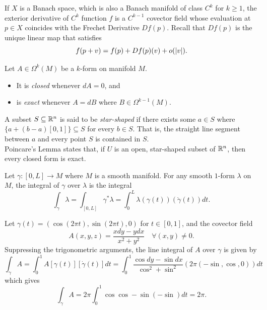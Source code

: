 \documentclass[../main-v2-manifolds.tex]{subfiles}
\begin{document}
\begin{remark}
    If $X$ is a Banach space, which is also a Banach manifold of class $C^k$ for $k\geq 1$, the exterior derivative of $C^k$ function $f$ is a $C^{k-1}$ covector field whose evaluation at $p\in X$ coincides with the Frechet Derivative $Df(p)$. Recall that $Df(p)$ is the unique linear map that satisfies
    \[
        f(p + v) = f(p) + Df(p)(v) + o(\vert {v} \vert).
    \]
\end{remark}
\begin{remark}
    Let $A\in \Omega^k(M)$ be a $k$-form on manifold $M$. 
    \begin{itemize}
        \item It is \emph{closed} whenever $dA = 0$, and
        \item is \emph{exact} whenever $A = dB$ where $B \in \Omega^{k-1}(M)$.
    \end{itemize}
\end{remark}
\begin{remark}
    A subset $S\subseteq{\mathbb{R}^n}$ is said to be \emph{star-shaped} if there exists some $a\in S$ where $\{a + (b-a)[0,1]\}\subseteq S$ for every $b\in S$. That is, the straight line segment between $a$ and every point $S$ is contained in $S$.\\

    Poincare's Lemma states that, if $U$ is an open, star-shaped subset of ${\mathbb{R}^n}$, then every closed form is exact.
\end{remark}
\begin{remark}
    Let $\gamma: [0,L]\to M$ where $M$ is a smooth manifold. For any smooth $1$-form $\lambda$ on $M$, the integral of $\gamma$ over $\lambda$ is the integral
    \[
        \int_\gamma \lambda =  \int_{[0,L]} \gamma^*\lambda = \int_{0}^{L}\lambda(\gamma(t))(\mathring{\gamma}(t))dt.
    \]
\end{remark}
\begin{example}
    Let $\gamma(t) = (\cos(2\pi t), \sin(2\pi t), 0)$ for $t\in[0,1]$, and the covector field 
    \[A(x,y,z) = \frac{xdy - ydx}{x^2 + y^2}\quad\forall (x,y)\neq 0.\]
    Suppressing the trigonometric arguments, the line integral of $A$ over $\gamma$ is given by
    \[\int_{\gamma}A = \int_{0}^{1} A[\gamma(t)][\dot{\gamma}(t)]dt = \int_0^1 \frac{\cos dy - \sin dx}{\cos^2 + \sin^2}(2\pi (-\sin, \cos,0))dt\]
    which gives
    \[\int_{\gamma} A = 2\pi\int_0^1\cos\cos - \sin(-\sin) dt = 2\pi.\]
\end{example}
\end{document}
